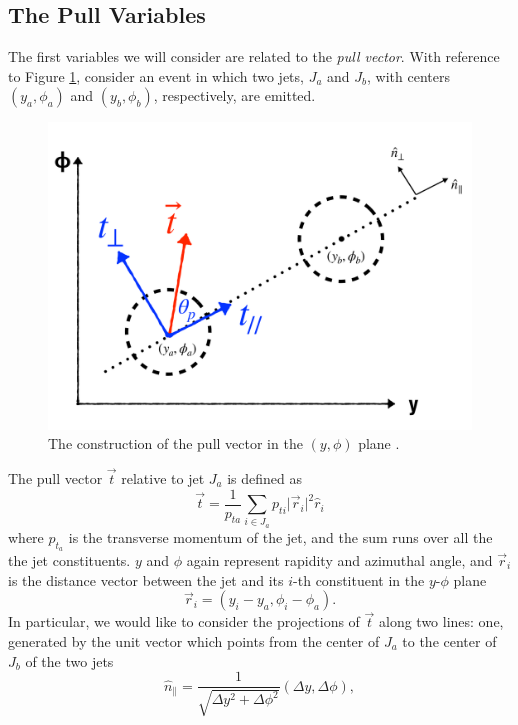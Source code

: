 \documentclass[10pt,a4paper]{book}
\begin{document}
\subsection{The Pull Variables}
The first variables we will consider are related to the \emph{pull vector}. With reference to Figure \ref{Pull vector}, consider an event in which two jets, $J_a$ and $J_b$, with centers $(y_a, \phi_a)$ and $(y_b, \phi_b)$, respectively, are emitted.
\begin{figure}
\centering
\includegraphics[scale=0.3]{ch4_images/pull_components}
\caption{The construction of the pull vector in the $(y, \phi)$ plane \cite{Larkoski:2019fsm}.}
\label{Pull vector}
\end{figure}
The pull vector $\vec{t}$ relative to jet $J_a$ is defined as
\begin{equation}
\vec{t} = \frac{1}{p_{ta}} \sum_{i \in J_a}p_{ti}\vert \vec{r}_i \vert^2 \hat{r}_i
\end{equation}
where $p_{t_a}$ is the transverse momentum of the jet, and the sum runs over all the the jet constituents. $y$ and $\phi$ again represent rapidity and azimuthal angle, and $\vec{r}_i$ is the distance vector between the jet and its $i$-th constituent in the $y$-$\phi$ plane
\begin{equation}
\vec{r}_i = (y_i - y_a, \phi_i - \phi_a).
\end{equation}
In particular, we would like to consider the projections of $\vec{t}$ along two lines: one, generated by the unit vector which points from the center of $J_a$ to the center of $J_b$ of the two jets
\begin{equation}
\hat{n}_\parallel = \frac{1}{\sqrt{\Delta y^2 + \Delta \phi^2}}\left(\Delta y, \Delta \phi \right),
\end{equation}
\end{document}
